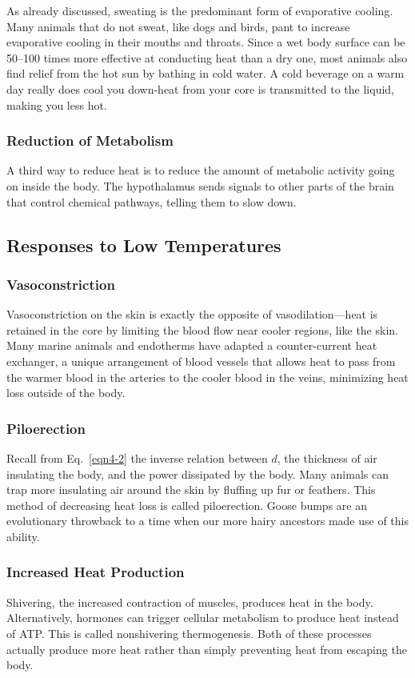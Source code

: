 As already discussed, sweating is the predominant form of evaporative cooling.  Many animals that do not sweat, like dogs and birds, pant to increase evaporative cooling in their mouths and throats.  Since a wet body surface can be 50--100 times more effective at conducting heat than a dry one, most animals also find relief from the hot sun by bathing in cold water.  A cold beverage on a warm day really does cool you down-heat from your core is transmitted to the liquid, making you less hot.

\subsubsection{Reduction of Metabolism}

A third way to reduce heat is to reduce the amount of metabolic activity going on inside the body.  The hypothalamus sends signals to other parts of the brain that control chemical pathways, telling them to slow down.  

\subsection{Responses to Low Temperatures}

\subsubsection{Vasoconstriction}

Vasoconstriction on the skin is exactly the opposite of vasodilation—heat is retained in the core by limiting the blood flow near cooler regions, like the skin.  Many marine animals and endotherms have adapted a counter-current heat exchanger, a unique arrangement of blood vessels that allows heat to pass from the warmer blood in the arteries to the cooler blood in the veins, minimizing heat loss outside of the body.  

\subsubsection{Piloerection}

Recall from Eq.~\ref{eqn4-2} the inverse relation between $d$, the thickness of air insulating the body, and the power dissipated by the body.  Many animals can trap more insulating air around the skin by fluffing up fur or feathers.  This method of decreasing heat loss is called piloerection.  Goose bumps are an evolutionary throwback to a time when our more hairy ancestors made use of this ability.

\subsubsection{Increased Heat Production}

Shivering, the increased contraction of muscles, produces heat in the body.  Alternatively,  hormones can trigger cellular metabolism to produce heat instead of ATP.  This is called nonshivering thermogenesis.  Both of these processes actually produce more heat rather than simply preventing heat from escaping the body.    

